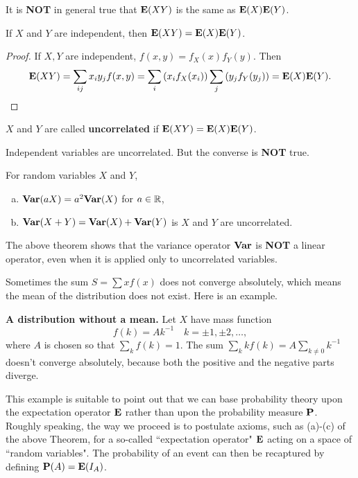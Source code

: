 \begin{caution}
It is \textbf{NOT} in general true that $\mathbf{E}(XY)$ is the same as $\mathbf{E}(X)\mathbf{E}(Y)$. 
\end{caution}

\begin{lemma}
If $X$ and $Y$ are independent, then $\mathbf{E}(XY) = \mathbf{E}(X)\mathbf{E}(Y)$. 
\end{lemma}
\begin{proof}
If $X, Y$ are independent, $f(x,y) = f_X(x) f_Y(y)$. Then
\begin{equation*}
    \mathbf{E}(XY) = \sum_{ij} x_i y_j f(x,y) = \sum_{i} \left( x_i f_X(x_i) \right) \sum_{j} \left( y_j f_Y(y_j) \right) = \mathbf{E}(X) \mathbf{E}(Y).
\end{equation*}
\end{proof}

\begin{definition}
$X$ and $Y$ are called \textbf{uncorrelated} if $\mathbf{E}(XY) = \mathbf{E}(X)\mathbf{E}(Y)$.
\end{definition}

\begin{caution}
Independent variables are uncorrelated. But the converse is \textbf{NOT} true.
\end{caution}

\begin{theorem}
For random variables $X$ and $Y$, 
\begin{enumerate}[(a)]
    \item $\mathbf{Var}(aX) = a^2 \mathbf{Var}(X)$ for $a \in \mathbb{R}$,
    \item $\mathbf{Var}(X+Y) = \mathbf{Var}(X) + \mathbf{Var}(Y)$ is $X$ and $Y$ are uncorrelated.
\end{enumerate}
\end{theorem}

\begin{remark}
The above theorem shows that the variance operator $\mathbf{Var}$ is \textbf{NOT} a linear operator, even when it 
is applied only to uncorrelated variables. 
\end{remark}

Sometimes the sum $S = \sum xf(x)$ does not converge absolutely, which means the mean of the distribution does not exist. Here is an example. 
\begin{example}
\textbf{A distribution without a mean.} Let $X$ have mass function 
\begin{equation*}
    f(k) = Ak^{-1} \quad k = \pm 1, \pm 2, \dots,
\end{equation*}
where $A$ is chosen so that $\sum_k f(k) = 1$. The sum $\sum_k kf(k) = A\sum_{k\neq 0} k^{-1}$ doesn't converge absolutely, because both the positive and the negative parts diverge. 
\end{example}
This example is suitable to point out that we can base probability theory upon the expectation operator $\mathbf{E}$ rather than upon the probability measure $\mathbf{P}$. Roughly speaking, the way we proceed is to postulate axioms, such as (a)-(c) of the above Theorem, for a so-called ``expectation operator" $\mathbf{E}$ acting on a space of ``random variables". The probability of an event can then be recaptured by defining $\mathbf{P}(A) = \mathbf{E}(I_A)$.  

